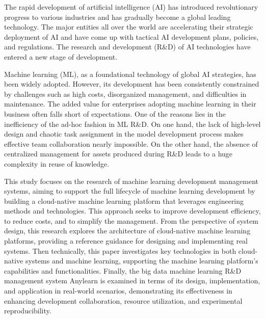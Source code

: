 \begin{abstract*}
  The rapid development of artificial intelligence (AI) has introduced revolutionary progress to various industries and has gradually become a global leading technology.
  The major entities all over the world are accelerating their strategic deployment of AI and have come up with tactical AI development plans, policies, and regulations.
  The research and development (R\&D) of AI technologies have entered a new stage of development.
  
  Machine learning (ML), as a foundational technology of global AI strategies, has been widely adopted.
  However, its development has been consistently constrained by challenges such as high costs, disorganized management, and difficulties in maintenance.
  The added value for enterprises adopting machine learning in their business often falls short of expectations.
  One of the reasons lies in the inefficiency of the ad-hoc fashion in ML R\&D.
  On one hand, the lack of high-level design and chaotic task assignment in the model development process makes effective team collaboration nearly impossible.
  On the other hand, the absence of centralized management for assets produced during R\&D leads to a huge complexity in reuse of knowledge.
  
  This study focuses on the research of machine learning development management systems, aiming to support the full lifecycle of machine learning development by building a cloud-native machine learning platform that leverages engineering methods and technologies.
  This approach seeks to improve development efficiency, to reduce costs, and to simplify the management.
  From the perspective of system design, this research explores the architecture of cloud-native machine learning platforms, providing a reference guidance for designing and implementing real systems.
  Then technically, this paper investigates key technologies in both cloud-native systems and machine learning, supporting the machine learning platform's capabilities and functionalities.
  Finally, the big data machine learning R\&D management system Anylearn is examined in terms of its design, implementation, and application in real-world scenarios, demonstrating its effectiveness in enhancing development collaboration, resource utilization, and experimental reproducibility.

\end{abstract*}
